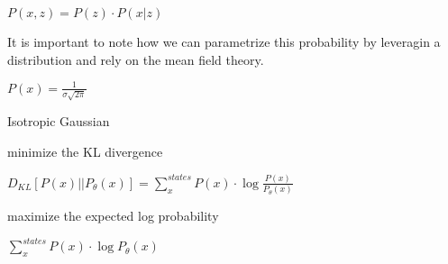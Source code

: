 \documentclass{amsart}
\begin{document}
$P(x,z) = P(z) \cdot P(x|z) $

It is important to note how we can parametrize this probability by leveragin a distribution and rely on the mean field theory.

$P(x) = \frac{1}{\sigma\sqrt{2\pi}}$



Isotropic Gaussian

minimize the KL divergence

$D_{KL}[P(x) || P_{\theta}(x)] = \sum\limits_{x}^{states}P(x)\cdot \log\frac{P(x)}{P_{\theta}(x)}$

maximize the expected log probability

$\sum\limits_{x}^{states}P(x)\cdot \log P_{\theta}(x) $




\clearpage
\end{document}
